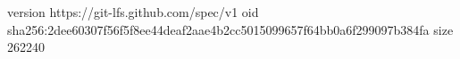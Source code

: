 version https://git-lfs.github.com/spec/v1
oid sha256:2dee60307f56f5f8ee44deaf2aae4b2cc5015099657f64bb0a6f299097b384fa
size 262240
